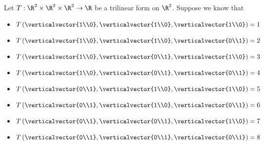\documentclass{ximera}
\begin{document}
\begin{question}
  Let $T:\R^2\times \R^2 \times \R^2 \to \R$ be a trilinear form on $\R^2$.  Suppose we know that
  \begin{itemize}
  \item $T\left( \verticalvector{1\\0},\verticalvector{1\\0},\verticalvector{1\\0}\right) = 1$
  \item $T\left( \verticalvector{1\\0},\verticalvector{1\\0},\verticalvector{0\\1}\right) = 2$
  \item $T\left( \verticalvector{1\\0},\verticalvector{0\\1},\verticalvector{1\\0}\right) = 3$
  \item $T\left( \verticalvector{1\\0},\verticalvector{0\\1},\verticalvector{0\\1}\right) = 4$
  \item $T\left( \verticalvector{0\\1},\verticalvector{1\\0},\verticalvector{1\\0}\right) = 5$
  \item $T\left( \verticalvector{0\\1},\verticalvector{1\\0},\verticalvector{0\\1}\right) = 6$
  \item $T\left( \verticalvector{0\\1},\verticalvector{0\\1},\verticalvector{1\\0}\right) = 7$
  \item $T\left( \verticalvector{0\\1},\verticalvector{0\\1},\verticalvector{0\\1}\right) = 8$
  \end{itemize}
  

\end{question}
\end{document}
